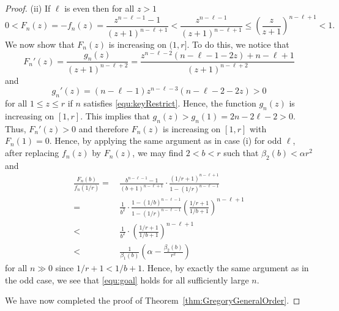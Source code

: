\documentclass[10pt,a4paper]{amsart}
\begin{document}
\begin{proof}
\medskip\noindent
(ii) If $\ell$ is even then  for all $z> 1$
\begin{equation*}
0<F_n(z)=-f_n(z)=\frac{z^{n-\ell-1}-1}{(z+1)^{n-\ell+1}}
<\frac{z^{n-\ell-1}}{(z+1)^{n-\ell+1}}
\le \left(\frac{z}{z+1} \right)^{n-\ell+1}<1.
\end{equation*}
We now show that $F_n(z)$ is increasing on $(1,r]$.
To do this, we notice  that
\begin{equation*}
F_n'(z)=\frac{g_n(z)}{(z+1)^{n-\ell+2}}=\frac{z^{n-\ell-2}(n-\ell-1-2z)+n-\ell+1}{(z+1)^{n-\ell+2}}
\end{equation*}
and
\begin{equation*}
g_n'(z)=(n-\ell-1)z^{n-\ell-3}(n-\ell-2-2z)>0
\end{equation*}
for all $1\le z\le r$ if $n$ satisfies \eqref{equ:keyRestrict}.
Hence, the function $g_n(z)$ is increasing on $[1,r]$. This implies that $g_n(z)>g_n(1)=2n-2\ell-2>0$.
Thus, $F_n'(z)>0$ and therefore $F_n(z)$ is increasing on $[1,r]$ with $F_n(1)=0$.
Hence, by applying the same argument as in  case (i) for odd $\ell$,
after replacing $f_n(z)$ by $F_n(z)$, we may find $2<b<r$ such that $\beta_2 (b)< \alpha r^2$
and
\begin{align*}
\frac {F_n(b)}{f_n(1/r)}=&\, \frac{b^{n-\ell-1}-1}{(b+1)^{n-\ell+1}}\cdot\frac{ (1/r+1)^{n-\ell+1}}{1-(1/r)^{n-\ell-1}}\\
=&\, \frac{1}{b^2}\cdot \frac{1-(1/b)^{n-\ell-1}}{1-(1/r)^{n-\ell-1}} \left(\frac{1/r+1}{1/b+1}\right)^{n-\ell+1}\\
< &\,  \frac{1}{b^2}\cdot \left(\frac{1/r+1}{1/b+1}\right)^{n-\ell+1}\\
<&\, \frac{1}{\beta_1 (b)}\left(\alpha-\frac{\beta_2 (b) }{r^2}\right)
\end{align*}
for all $n\gg 0$ since $1/r+1<1/b+1$. Hence, by exactly the same argument as
in the odd case, we see that \eqref{equ:goal} holds for all sufficiently large $n$.

We have now completed the proof of Theorem~\ref{thm:GregoryGeneralOrder}.
\end{proof}
\end{document}
